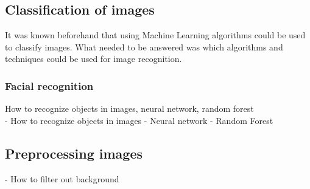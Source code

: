 \subsection{Classification of images}
It was known beforehand that using Machine Learning algorithms could be used to classify images. What needed to be answered was which algorithms and techniques could be used for image recognition. 

\subsubsection{Facial recognition}
How to recognize objects in images, neural network, random forest\\
- How to recognize objects in images
	- Neural network
	- Random Forest

\subsection{Preprocessing images}
\label{sec:litterature}
- How to filter out background